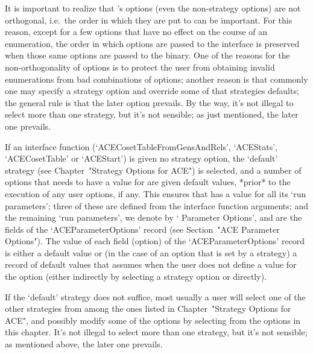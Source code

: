 
It  is  important  to  realize  that  {\ACE}'s   options   (even   the
non-strategy options) are not orthogonal, i.e.\  the  order  in  which
they are put to {\ACE} can be important. For this reason, except for a
few options that have no effect on the course of an  enumeration,  the
order in which options are passed to the {\ACE} interface is preserved
when those same options are passed to the {\ACE} binary.  One  of  the
reasons for the non-orthogonality of options is to  protect  the  user
from obtaining invalid enumerations from bad combinations of  options;
another reason is that commonly one may specify a strategy option  and
override some of that strategies defaults; the general  rule  is  that
the later option prevails. By the way, it's not illegal to select more
than one strategy, but it's not sensible; as just mentioned, the later
one prevails.


If  an  {\ACE}  interface  function   (`ACECosetTableFromGensAndRels',
`ACEStats',  `ACECosetTable'  or  `ACEStart')  is  given  no  strategy
option, the `default'  strategy  (see  Chapter~"Strategy  Options  for
ACE") is selected, and a number of options that {\ACE} needs to have a
value for are given default values, *prior* to the  execution  of  any
user options, if any. This ensures that {\ACE} has a value for all its
\lq{}run parameters'; three of  these  are  defined  from  the  {\ACE}
interface function arguments; and the remaining \lq{}run  parameters',
we denote by \lq{}{\ACE} Parameter Options', and are the fields of the
`ACEParameterOptions' record (see  Section~"ACE  Parameter  Options").
The value of each field (option) of the  `ACEParameterOptions'  record
is either a default value or (in the case of an option that is set  by
a strategy) a record of default values that {\ACE}  assumes  when  the
user does not define a value for  the  option  (either  indirectly  by
selecting a strategy option or directly).

If the `default' strategy does not suffice, most usually a  user  will
select one of the other strategies  from  among  the  ones  listed  in
Chapter~"Strategy Options for ACE", and possibly modify  some  of  the
options by selecting from  the  options  in  this  chapter.  It's  not
illegal to select more than one strategy, but it's  not  sensible;  as
mentioned above, the later one prevails.

